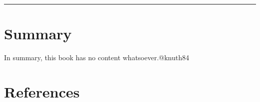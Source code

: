 \documentclass[
  letterpaper,
  DIV=11,
  numbers=noendperiod]{scrreprt}
\newlength{\cslhangindent}
\newenvironment{CSLReferences}[2] %
 {\begin{list}{}{%
  \setlength{\itemindent}{0pt}
  \setlength{\leftmargin}{0pt}
  \setlength{\parsep}{0pt}
  \ifodd #1
   \setlength{\leftmargin}{\cslhangindent}
   \setlength{\itemindent}{-1\cslhangindent}
  \fi
  \setlength{\itemsep}{#2\baselineskip}}}
 {\end{list}}
\begin{document}
\begin{center}\rule{0.5\linewidth}{0.5pt}\end{center}


\chapter{Summary}\label{summary}

In summary, this book has no content whatsoever.@knuth84


\chapter*{References}\label{references}


\label{refs}
\begin{CSLReferences}{0}{1}
\end{CSLReferences}
\end{document}
